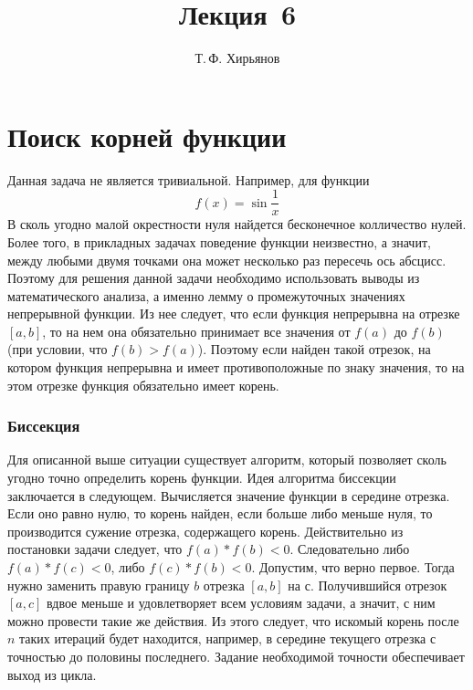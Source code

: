 \documentclass[a4paper, fleqn]{article}
\title{Лекция \textnumero\,6}
\author{Т.\,Ф. Хирьянов}
\date{}
\begin{document}
	\maketitle
	
\section*{Поиск корней функции}

Данная задача не является тривиальной. Например, для функции
\[f(x) = \sin{\frac{1}{x}}\]
В сколь угодно малой окрестности нуля найдется бесконечное колличество нулей. Более того, в прикладных задачах поведение функции неизвестно, а значит, между любыми двумя точками она может несколько раз пересечь ось абсцисс. Поэтому для решения данной задачи необходимо использовать выводы из математического анализа, а именно лемму о промежуточных значениях непрерывной функции. Из нее следует, что если функция непрерывна на отрезке $[a, b]$, то на нем она обязательно принимает все значения от $f(a)$ до $f(b)$ (при условии, что $f(b) > f(a)$). Поэтому если найден такой отрезок, на котором функция непрерывна и имеет противоположные по знаку значения, то на этом отрезке функция обязательно имеет корень. 

\subsubsection*{Биссекция}

Для описанной выше ситуации существует алгоритм, который позволяет сколь угодно точно определить корень функции. Идея алгоритма биссекции заключается в следующем. Вычисляется значение функции в середине отрезка. Если оно равно нулю, то корень найден, если больше либо меньше нуля, то производится сужение отрезка, содержащего корень. Действительно из постановки задачи следует, что $f(a)*f(b) < 0$. Следовательно либо $f(a)*f(c) < 0$, либо $f(c)*f(b) < 0$. Допустим, что верно первое. Тогда нужно заменить правую границу $b$ отрезка $[a, b]$ на с. Получившийся отрезок $[a, c]$ вдвое меньше и удовлетворяет всем условиям задачи, а значит, с ним можно провести такие же действия. Из этого следует, что искомый корень после $n$ таких итераций будет находится, например, в середине текущего отрезка с точностью до половины последнего. Задание необходимой точности обеспечивает выход из цикла. 

%		
\end{document}
